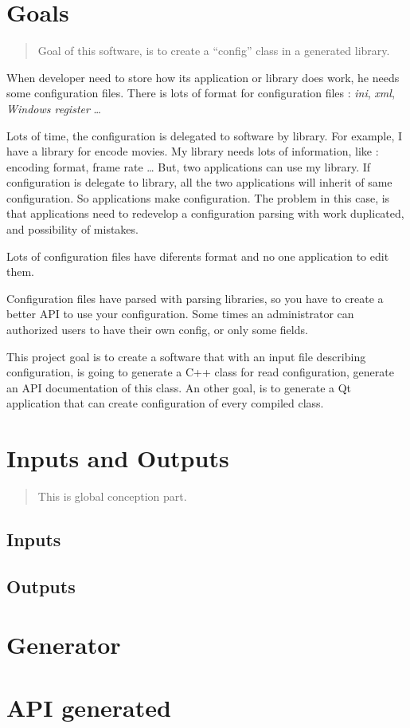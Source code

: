 \documentclass[a4paper]{article}
\begin{document}
 \tableofcontents
 \section{Goals}
 \begin{abstract}
   Goal of this software, is to create a “config” class in a generated library.
 \end{abstract}

  When developer need to store how its application or library does work, he needs some configuration files.
 There is lots of format for configuration files : \emph{ini}, \emph{xml}, \emph{Windows register} \dots

 Lots of time, the configuration is delegated to software by library. For example, I have a library for encode movies. My library needs lots of information, like : encoding format,
 frame rate \dots
 But, two applications can use my library. If configuration is delegate to library, all the two applications will inherit of same configuration. So applications make configuration.
 The problem in this case, is that applications need to redevelop a configuration parsing with work duplicated, and possibility of mistakes.

 Lots of configuration files have diferents format and no one application to edit them.

 Configuration files have parsed with parsing libraries, so you have to create a better API to use your configuration. Some times an administrator can authorized users to have their own
 config, or only some fields.

 This project goal is to create a software that with an input file describing configuration, is going to generate a C++ class for read configuration, generate an API documentation of this
 class.
 An other goal, is to generate a Qt application that can create configuration of every compiled class.

 \section{Inputs and Outputs}
 \begin{abstract}
   This is global conception part.
 \end{abstract}

 \subsection{Inputs}
 \subsection{Outputs}
 \section{Generator}
 \section{API generated}
\end{document}
